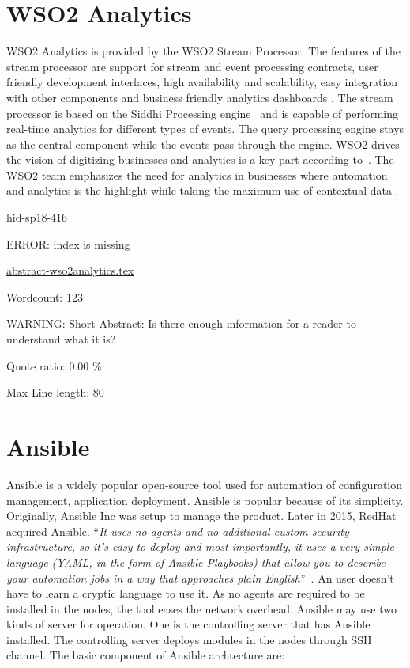 \section{WSO2 Analytics}

WSO2 Analytics is provided by the WSO2 Stream Processor. The features of the 
stream processor are support for stream and event processing contracts, user 
friendly development interfaces, high availability and scalability, easy 
integration with other components and business friendly analytics dashboards 
\cite{hid-sp18-416-www-wso2-stream-processor}. The stream processor is based on 
the Siddhi Processing engine~\cite{hid-sp18-416-github-siddhi} and is capable 
of  performing real-time analytics for different types of events. The query 
processing engine stays as the central component while the events pass through 
the engine. WSO2 drives the vision of digitizing businesses and analytics is a 
key part according to~\cite{hid-sp18-416-www-srinath-conference-talk}. The WSO2 
team emphasizes the need for analytics in businesses where automation and 
analytics is the highlight while taking the maximum use of contextual data 
\cite{hid-sp18-416-www-business-benefits-analytics}.

\begin{IU}

hid-sp18-416

ERROR: index is missing

\href{https://github.com/cloudmesh-community/hid-sp18-416/blob/master//technology/abstract-wso2analytics.tex}{abstract-wso2analytics.tex}

 

Wordcount: 123

WARNING: Short Abstract: Is there enough information for a reader to understand what it is?


Quote ratio: 0.00 \%
 
Max Line length: 80
\end{IU}

\section{Ansible}

Ansible is a widely popular open-source tool used for automation of
configuration management, application deployment. Ansible is popular
because of its simplicity. Originally, Ansible Inc was setup to manage
the product. Later in 2015, RedHat acquired Ansible.  \color{blue}``\emph{It uses no
agents and no additional custom security infrastructure, so it's easy
to deploy and most importantly, it uses a very simple language (YAML,
in the form of Ansible Playbooks) that allow you to describe your
automation jobs in a way that approaches plain
English}''\color{black}~\cite{hid-sp18-417-doc-Ansible}.  An user doesn't have to
learn a cryptic language to use it.  As no agents are required to be
installed in the nodes, the tool eases the network overhead. Ansible
may use two kinds of server for operation. One is the controlling
server that has Ansible installed.  The controlling server deploys
modules in the nodes through SSH channel.  The basic component of
Ansible archtecture are:

